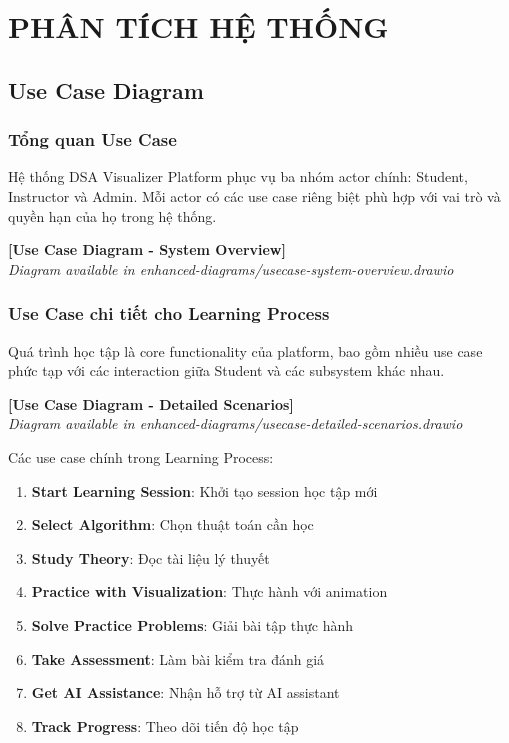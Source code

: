 \chapter{PHÂN TÍCH HỆ THỐNG}
\label{ch:system-analysis}

\section{Use Case Diagram}
\label{sec:use-case-diagram}

\subsection{Tổng quan Use Case}
\label{subsec:use-case-overview}

Hệ thống DSA Visualizer Platform phục vụ ba nhóm actor chính: Student, Instructor và Admin. Mỗi actor có các use case riêng biệt phù hợp với vai trò và quyền hạn của họ trong hệ thống.

\begin{center}
\textbf{[Use Case Diagram - System Overview]}\\
\textit{Diagram available in enhanced-diagrams/usecase-system-overview.drawio}
\end{center}

\subsection{Use Case chi tiết cho Learning Process}
\label{subsec:learning-process-usecase}

Quá trình học tập là core functionality của platform, bao gồm nhiều use case phức tạp với các interaction giữa Student và các subsystem khác nhau.

\begin{center}
\textbf{[Use Case Diagram - Detailed Scenarios]}\\
\textit{Diagram available in enhanced-diagrams/usecase-detailed-scenarios.drawio}
\end{center}

Các use case chính trong Learning Process:

\begin{enumerate}
    \item \textbf{Start Learning Session}: Khởi tạo session học tập mới
    \item \textbf{Select Algorithm}: Chọn thuật toán cần học
    \item \textbf{Study Theory}: Đọc tài liệu lý thuyết
    \item \textbf{Practice with Visualization}: Thực hành với animation
    \item \textbf{Solve Practice Problems}: Giải bài tập thực hành
    \item \textbf{Take Assessment}: Làm bài kiểm tra đánh giá
    \item \textbf{Get AI Assistance}: Nhận hỗ trợ từ AI assistant
    \item \textbf{Track Progress}: Theo dõi tiến độ học tập
\end{enumerate}


